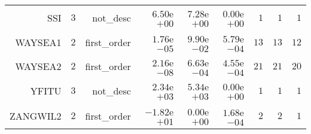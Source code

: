 \begin{longtable}{rrrrrrrrr}
SSI & \(     3\) & not\_desc & \( 6.50\)e\(+00\) & \( 7.28\)e\(+00\) & \( 0.00\)e\(+00\) & \(     1\) & \(     1\) & \(     1\) \\
WAYSEA1 & \(     2\) & first\_order & \( 1.76\)e\(-05\) & \( 9.90\)e\(-02\) & \( 5.79\)e\(-04\) & \(    13\) & \(    13\) & \(    12\) \\
WAYSEA2 & \(     2\) & first\_order & \( 2.16\)e\(-08\) & \( 6.63\)e\(-04\) & \( 4.55\)e\(-04\) & \(    21\) & \(    21\) & \(    20\) \\
YFITU & \(     3\) & not\_desc & \( 2.34\)e\(+03\) & \( 5.34\)e\(+03\) & \( 0.00\)e\(+00\) & \(     1\) & \(     1\) & \(     1\) \\
ZANGWIL2 & \(     2\) & first\_order & \(-1.82\)e\(+01\) & \( 0.00\)e\(+00\) & \( 1.68\)e\(-04\) & \(     2\) & \(     2\) & \(     1\) \\\hline
\end{longtable}
